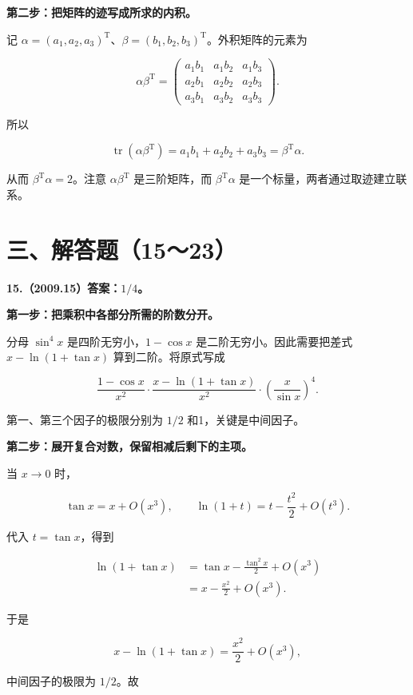 \documentclass[UTF8,11pt,fontset=windows]{ctexart}
\begin{document}
\textbf{第二步：把矩阵的迹写成所求的内积。}

记 $\alpha=(a_1,a_2,a_3)^{\mathrm T}$、$\beta=(b_1,b_2,b_3)^{\mathrm T}$。外积矩阵的元素为

$$
\alpha\beta^{\mathrm T}
=\begin{pmatrix}
a_1b_1&a_1b_2&a_1b_3\\
a_2b_1&a_2b_2&a_2b_3\\
a_3b_1&a_3b_2&a_3b_3
\end{pmatrix}.
$$

所以

$$
\operatorname{tr}(\alpha\beta^{\mathrm T})
=a_1b_1+a_2b_2+a_3b_3
=\beta^{\mathrm T}\alpha.
$$

从而 $\boxed{\beta^{\mathrm T}\alpha=2}$。注意 $\alpha\beta^{\mathrm T}$ 是三阶矩阵，而 $\beta^{\mathrm T}\alpha$ 是一个标量，两者通过取迹建立联系。

\clearpage

\section*{三、解答题（15～23）}

\textbf{15.（2009.15）答案：$1/4$。}

\textbf{第一步：把乘积中各部分所需的阶数分开。}

分母 $\sin^4x$ 是四阶无穷小，$1-\cos x$ 是二阶无穷小。因此需要把差式 $x-\ln(1+\tan x)$ 算到二阶。将原式写成

$$
\frac{1-\cos x}{x^2}
\cdot\frac{x-\ln(1+\tan x)}{x^2}
\cdot\left(\frac{x}{\sin x}\right)^4.
$$

第一、第三个因子的极限分别为 $1/2$ 和1，关键是中间因子。

\textbf{第二步：展开复合对数，保留相减后剩下的主项。}

当 $x\to0$ 时，

$$
\tan x=x+O(x^3),
\qquad \ln(1+t)=t-\frac{t^2}{2}+O(t^3).
$$

代入 $t=\tan x$，得到

$$
\begin{aligned}
\ln(1+\tan x)
&=\tan x-\frac{\tan^2x}{2}+O(x^3)\\
&=x-\frac{x^2}{2}+O(x^3).
\end{aligned}
$$

于是

$$
x-\ln(1+\tan x)=\frac{x^2}{2}+O(x^3),
$$

中间因子的极限为 $1/2$。故
\end{document}
